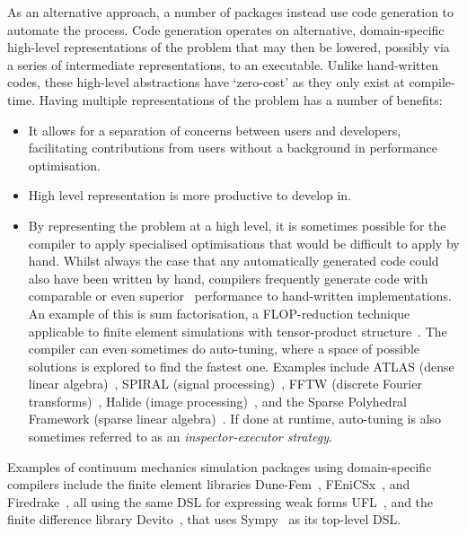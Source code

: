 \documentclass[thesis]{subfiles}
\begin{document}
As an alternative approach, a number of packages instead use code generation to automate the process.
Code generation operates on alternative, domain-specific high-level representations of the problem that may then be lowered, possibly via a series of intermediate representations, to an executable.
Unlike hand-written codes, these high-level abstractions have `zero-cost' as they only exist at compile-time.
Having multiple representations of the problem has a number of benefits:

\begin{itemize}
  \item
    It allows for a separation of concerns between users and developers, facilitating contributions from users without a background in performance optimisation.
  \item
    High level representation is more productive to develop in.
  \item
    By representing the problem at a high level, it is sometimes possible for the compiler to apply specialised optimisations that would be difficult to apply by hand.
    Whilst always the case that any automatically generated code could also have been written by hand, compilers frequently generate code with comparable or even superior~\cite{ragan-kelleyHalideLanguageCompiler} performance to hand-written implementations.
    An example of this is sum factorisation, a FLOP-reduction technique applicable to finite element simulations with tensor-product structure~\cite{homolyaExposingExploitingStructure2017}.
    The compiler can even sometimes do auto-tuning, where a space of possible solutions is explored to find the fastest one.
    Examples include ATLAS (dense linear algebra)~\cite{whaleyAutomatedEmpiricalOptimizations2001}, SPIRAL (signal processing)~\cite{puschelSPIRALCodeGeneration2005}, FFTW (discrete Fourier transforms)~\cite{frigoDesignImplementationFFTW32005}, Halide (image processing)~\cite{ragan-kelleyHalideLanguageCompiler}, and the Sparse Polyhedral Framework (sparse linear algebra)~\cite{stroutSparsePolyhedralFramework2018}.
    If done at runtime, auto-tuning is also sometimes referred to as an \emph{inspector-executor strategy}.
\end{itemize}

Examples of continuum mechanics simulation packages using domain-specific compilers include the finite element libraries Dune-Fem~\cite{dednerGenericInterfaceParallel2010}, FEniCSx~\cite{barattaDOLFINxNextGeneration2023}, and Firedrake~\cite{FiredrakeUserManual}, all using the same DSL for expressing weak forms UFL~\cite{alnaesUnifiedFormLanguage2014a}, and the finite difference library Devito~\cite{devito-api,luporiniArchitecturePerformanceDevito2020}, that uses Sympy~\cite{10.7717/peerj-cs.103} as its top-level DSL.
\end{document}
